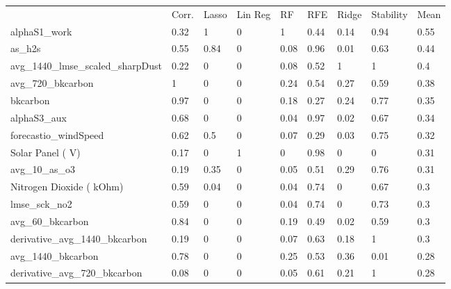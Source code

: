 \begin{table}[H]
\centering
\begin{tabular}{lllllllll}
\\
\\
\toprule
     & Corr. & Lasso & Lin Reg & RF   & RFE  & Ridge & Stability & Mean \\
\midrule
alphaS1\_work                                  & 0.32  & 1     & 0          & 1    & 0.44 & 0.14  & 0.94      & 0.55 \\
as\_h2s                                        & 0.55  & 0.84  & 0          & 0.08 & 0.96 & 0.01  & 0.63      & 0.44 \\
avg\_1440\_lmse\_scaled\_sharpDust             & 0.22  & 0     & 0          & 0.08 & 0.52 & 1     & 1         & 0.4  \\
avg\_720\_bkcarbon                             & 1     & 0     & 0          & 0.24 & 0.54 & 0.27  & 0.59      & 0.38 \\
bkcarbon                                       & 0.97  & 0     & 0          & 0.18 & 0.27 & 0.24  & 0.77      & 0.35 \\
alphaS3\_aux                                   & 0.68  & 0     & 0          & 0.04 & 0.97 & 0.02  & 0.67      & 0.34 \\
forecastio\_windSpeed                          & 0.62  & 0.5   & 0          & 0.07 & 0.29 & 0.03  & 0.75      & 0.32 \\
Solar Panel ( V)                               & 0.17  & 0     & 1          & 0    & 0.98 & 0     & 0         & 0.31 \\
avg\_10\_as\_o3                                & 0.19  & 0.35  & 0          & 0.05 & 0.51 & 0.29  & 0.76      & 0.31 \\
Nitrogen Dioxide ( kOhm)                       & 0.59  & 0.04  & 0          & 0.04 & 0.74 & 0     & 0.67      & 0.3  \\
lmse\_sck\_no2                                 & 0.59  & 0     & 0          & 0.04 & 0.74 & 0     & 0.73      & 0.3  \\
avg\_60\_bkcarbon                              & 0.84  & 0     & 0          & 0.19 & 0.49 & 0.02  & 0.59      & 0.3  \\
derivative\_avg\_1440\_bkcarbon                & 0.19  & 0     & 0          & 0.07 & 0.63 & 0.18  & 1         & 0.3  \\
avg\_1440\_bkcarbon                            & 0.78  & 0     & 0          & 0.25 & 0.53 & 0.36  & 0.01      & 0.28 \\
derivative\_avg\_720\_bkcarbon                 & 0.08  & 0     & 0          & 0.05 & 0.61 & 0.21  & 1         & 0.28 \\

\end{tabular}
\end{table}
